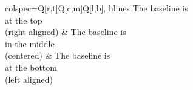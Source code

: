 \documentclass{ltugboat}
\begin{document}
\begin{tblr}{colspec={Q[r,t]Q[c,m]Q[l,b]}, hlines}
{The baseline is\\ at the top\\ (right aligned)} & 
{The baseline is\\ in the middle\\ (centered)} & 
{The baseline is\\ at the bottom\\ (left aligned)}\\ 
\end{tblr}
\end{document}
